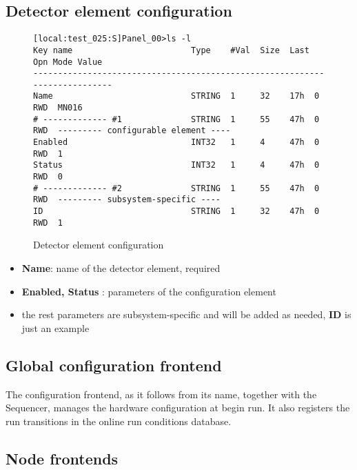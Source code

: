 \subsection {Detector element configuration}

\begin{figure}[H]
{ \scriptsize
\begin{verbatim}
[local:test_025:S]Panel_00>ls -l
Key name                        Type    #Val  Size  Last Opn Mode Value
---------------------------------------------------------------------------
Name                            STRING  1     32    17h  0   RWD  MN016
# ------------- #1              STRING  1     55    47h  0   RWD  --------- configurable element ----
Enabled                         INT32   1     4     47h  0   RWD  1
Status                          INT32   1     4     47h  0   RWD  0
# ------------- #2              STRING  1     55    47h  0   RWD  --------- subsystem-specific ----
ID                              STRING  1     32    47h  0   RWD  1
\end{verbatim}
}
\caption{
  \label{figure:detector_element_config}
  Detector element configuration
}
\end{figure}

\begin{itemize}
\item
  {\bf Name}: name of the detector element, required
\item 
  {\bf Enabled, Status} : parameters of the configuration element
\item
  the rest parameters are subsystem-specific and will be added as needed, {\bf ID} is just an example
\end{itemize}

\subsection{Global configuration frontend}
\label{sec:conf_frontends}

The configuration frontend, as it follows from its name, together with the
Sequencer, manages the hardware configuration at begin run.
It also registers the run transitions in the online run conditions database.


\subsection{Node frontends}
\label{sec:node_frontends}

